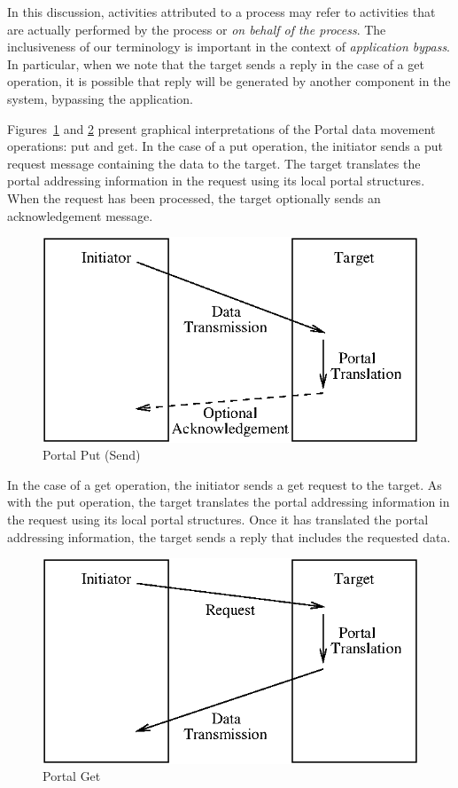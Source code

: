 \documentclass{sand-report}
\begin{document}
In this discussion, activities attributed to a process may refer to
activities that are actually performed by the process or \emph{on
  behalf of the process}.  The inclusiveness of our terminology is
important in the context of \emph{application bypass}.  In particular,
when we note that the target sends a reply in the case of a get
operation, it is possible that reply will be generated by another
component in the system, bypassing the application.

Figures~\ref{fig:put} and \ref{fig:get} present graphical
interpretations of the Portal data movement operations: put and get.
In the case of a put operation, the initiator sends a put request
message containing the data to the target.  The target translates the
portal addressing information in the request using its local portal
structures.  When the request has been processed, the target
optionally sends an acknowledgement message.

\begin{figure}[htbp]
\centerline{\includegraphics{put.eps}}
\caption{Portal Put (Send)}
\label{fig:put}
\end{figure}

In the case of a get operation, the initiator sends a get request to
the target.  As with the put operation, the target translates the
portal addressing information in the request using its local portal
structures.  Once it has translated the portal addressing information,
the target sends a reply that includes the requested data.

\begin{figure}[htbp]
\centerline{\includegraphics{get.eps}}
\caption{Portal Get}
\label{fig:get}
\end{figure}
\end{document}
